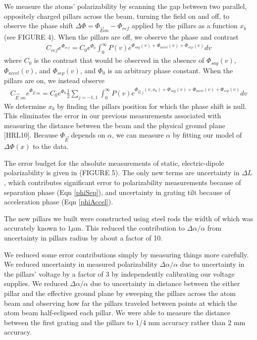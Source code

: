 \documentclass[twocolumn, prl,showpacs,superscriptaddress]{revtex4-1}   %
\newcommand{\eqnref}[1]{Eqn \ref{#1}}
\begin{document}
We measure the atoms' polarizability by scanning the gap between two parallel, oppositely charged pillars across the beam, turning the field on and off, to observe the phase shift $\Delta\Phi = \Phi_{\vec{E} on} - \Phi_{ref}$ applied by the pillars as a function $x_b$ (see FIGURE 4). When the pillars are off, we observe the phase and contrast
\begin{align}
	C_{ref}e^{\Phi_{ref}} = 
		C_0e^{\Phi_0}
		\int_0^{\infty} P(v) 
		e^{\Phi_{sag}(v) + \Phi_{accel}(v) + \Phi_{sep}(v)} 
		dv
	\label{CPRef}
\end{align}
where $C_0$ is the contrast that would be observed in the absence of $\Phi_{sag}(v)$, $\Phi_{accel}(v)$, and $\Phi_{sep}(v)$, and $\Phi_0$ is an arbitrary phase constant. When the pillars are on, we instead observe
\begin{align}
	C_{\vec{E}\textit{ on}}e^{\Phi_{\vec{E}\textit{ on}}} = 
		C_0e^{\Phi_0}		
		\frac{1}{2} \sum_{j=-1,1}
		\int_0^{\infty} P(v) 
		e^{
			\Phi_{\vec{E},j}(v,x_b) + 
			\Phi_{sag}(v) + \Phi_{accel}(v) + \Phi_{sep}(v)
		} 
		dv
	\label{CPEOn}
\end{align}
We determine $x_b$ by finding the pillars position for which the phase shift is null. This eliminates the error in our previous measurements associated with measuring the distance between the beam and the physical ground plane [HRL10].
Because $\Phi_{\vec{E}}$ depends on $\alpha$, we can measure $\alpha$ by fitting our model of $\Delta\Phi(x)$ to the data.

The error budget for the absolute measurements of static, electric-dipole polarizability is given in (FIGURE 5). The only new terms are uncertainty in $\Delta L$, which contributes significant error to polarizability measurements because of separation phase (\eqnref{phiSep}), and uncertainty in grating tilt because of acceleration phase (\eqnref{phiAccel}).

The new pillars we built were constructed using steel rods the width of which was accurately known to $1 \mu \text{m}$. This reduced the contribution to $\Delta\alpha/\alpha$ from uncertainty in pillars radius by about a factor of 10.

We reduced some error contributions simply by measuring things more carefully. We reduced uncertainty in measured polarizability $\Delta\alpha/\alpha$ due to uncertainty in the pillars' voltage by a factor of 3 by independently calibrating our voltage supplies. We reduced $\Delta\alpha/\alpha$ due to uncertainty in distance between the either pillar and the effective ground plane by sweeping the pillars across the atom beam and observing how far the pillars traveled between points at which the atom beam half-eclipsed each pillar. We were able to measure the distance between the first grating and the pillars to 1/4 mm accuracy rather than 2 mm accuracy. 
\end{document}
